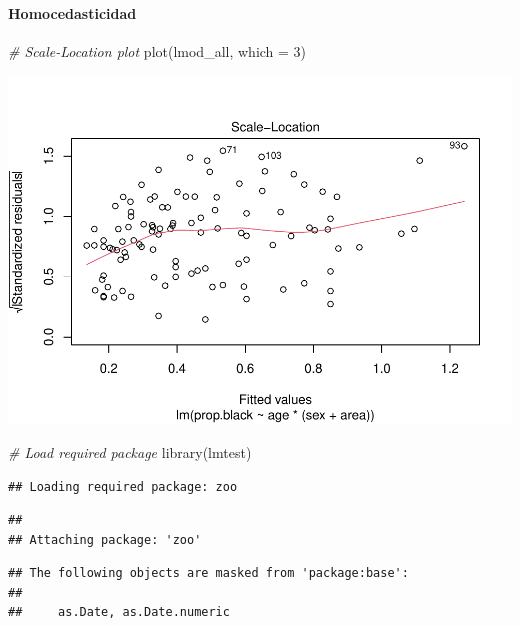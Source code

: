 \documentclass[
]{article}
\newenvironment{Shaded}{\begin{snugshade}}{\end{snugshade}}
\newcommand{\AttributeTok}[1]{\textcolor[rgb]{0.77,0.63,0.00}{#1}}
\newcommand{\CommentTok}[1]{\textcolor[rgb]{0.56,0.35,0.01}{\textit{#1}}}
\newcommand{\DecValTok}[1]{\textcolor[rgb]{0.00,0.00,0.81}{#1}}
\newcommand{\FunctionTok}[1]{\textcolor[rgb]{0.00,0.00,0.00}{#1}}
\newcommand{\NormalTok}[1]{#1}
\begin{document}
\hypertarget{homocedasticidad}{%
\paragraph{Homocedasticidad}\label{homocedasticidad}}

\begin{Shaded}
\begin{Highlighting}[]
\CommentTok{\# Scale{-}Location plot}
\FunctionTok{plot}\NormalTok{(lmod\_all, }\AttributeTok{which =} \DecValTok{3}\NormalTok{)}
\end{Highlighting}
\end{Shaded}

\includegraphics{code_files/figure-latex/unnamed-chunk-18-1.pdf}

\begin{Shaded}
\begin{Highlighting}[]
\CommentTok{\# Load required package}
\FunctionTok{library}\NormalTok{(lmtest)}
\end{Highlighting}
\end{Shaded}

\begin{verbatim}
## Loading required package: zoo
\end{verbatim}

\begin{verbatim}
## 
## Attaching package: 'zoo'
\end{verbatim}

\begin{verbatim}
## The following objects are masked from 'package:base':
## 
##     as.Date, as.Date.numeric
\end{verbatim}
\end{document}
